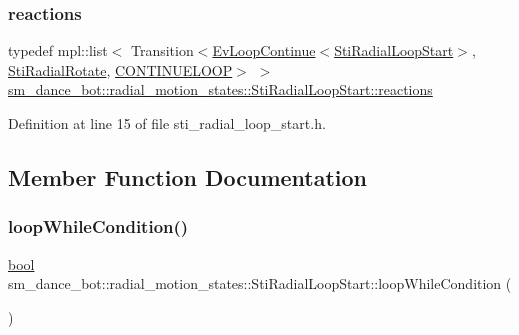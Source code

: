 \subsubsection{\texorpdfstring{reactions}{reactions}}
{\footnotesize\ttfamily typedef mpl\+::list$<$ Transition$<$\hyperlink{structsmacc_1_1default__events_1_1EvLoopContinue}{Ev\+Loop\+Continue}$<$\hyperlink{structsm__dance__bot_1_1radial__motion__states_1_1StiRadialLoopStart}{Sti\+Radial\+Loop\+Start}$>$, \hyperlink{structsm__dance__bot_1_1radial__motion__states_1_1StiRadialRotate}{Sti\+Radial\+Rotate}, \hyperlink{structsmacc_1_1default__transition__tags_1_1CONTINUELOOP}{C\+O\+N\+T\+I\+N\+U\+E\+L\+O\+OP}$>$ $>$ \hyperlink{structsm__dance__bot_1_1radial__motion__states_1_1StiRadialLoopStart_a817d8c91080ccf4ff0f387455d26f94c}{sm\+\_\+dance\+\_\+bot\+::radial\+\_\+motion\+\_\+states\+::\+Sti\+Radial\+Loop\+Start\+::reactions}}



Definition at line 15 of file sti\+\_\+radial\+\_\+loop\+\_\+start.\+h.



\subsection{Member Function Documentation}
\mbox{\label{structsm__dance__bot_1_1radial__motion__states_1_1StiRadialLoopStart_a05d31b8062dae8eccc4d66ab21a0b720}} 
\subsubsection{\texorpdfstring{loop\+While\+Condition()}{loopWhileCondition()}}
{\footnotesize\ttfamily \hyperlink{classbool}{bool} sm\+\_\+dance\+\_\+bot\+::radial\+\_\+motion\+\_\+states\+::\+Sti\+Radial\+Loop\+Start\+::loop\+While\+Condition (\begin{DoxyParamCaption}{ }\end{DoxyParamCaption})\hspace{0.3cm}{\ttfamily [inline]}}



